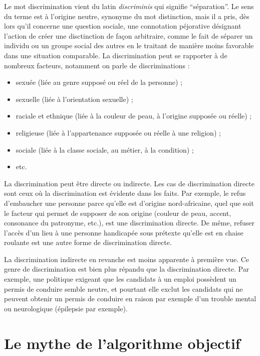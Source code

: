 \documentclass[a4paper,12pt]{report}
\begin{document}
Le mot discrimination vient du latin \textit{discriminis} qui signifie ``séparation''. Le sens du terme est à l'origine neutre, synonyme du mot distinction, mais il a pris, dès lors qu'il concerne une question sociale, une connotation péjorative désignant l'action de créer une disctinction de façon arbitraire, comme le fait de séparer un individu ou un groupe social des autres en le traitant de manière moins favorable dans une situation comparable.
La discrimination peut se rapporter à de nombreux facteurs, notamment on parle de discriminations :

\begin{itemize}
 \item sexuée (liée au genre supposé ou réel de la personne) ; 
 \item sexuelle (liée à l'orientation sexuelle) ;
 \item raciale et ethnique (liée à la couleur de peau, à l'origine supposée ou réelle) ;
 \item religieuse (liée à l'appartenance supposée ou réelle à une religion) ;
 \item sociale (liée à la classe sociale, au métier, à la condition) ;
 \item etc.
\end{itemize}

La discrimination peut être directe ou indirecte. Les cas de discrimination directe sont ceux où la discrimination est évidente dans les faits. Par exemple, le refus d'embaucher une personne parce qu'elle est d'origine nord-africaine, quel que soit le facteur qui permet de supposer de son origine (couleur de peau, accent, consonance du patronyme, etc.), est une discrimination directe. De même, refuser l'accès d'un lieu à une personne handicapée sous prétexte qu'elle est en chaise roulante est une autre forme de discrimination directe.

La discrimination indirecte en revanche est moins apparente à première vue. Ce genre de discrimination est bien plus répandu que la discrimination directe. Par exemple, une politique exigeant que les candidats à un emploi possèdent un permis de conduire semble neutre, et pourtant elle exclut les candidats qui ne peuvent obtenir un permis de conduire en raison par exemple d'un trouble mental ou neurologique (épilepsie par exemple).

\section{Le mythe de l'algorithme objectif}
\end{document}
